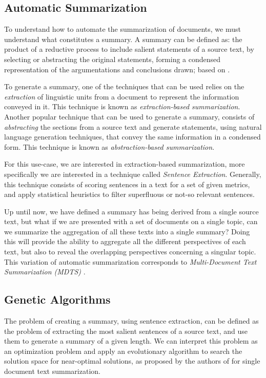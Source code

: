 \documentclass[12pt, titlepage]{uo_temp}
\begin{document}
     \subsection{Automatic Summarization}
     To understand how to automate the summarization of documents, we must understand
     what constitutes a summary. A summary can be defined as: the product of a reductive process
     to include salient statements of a source text, by selecting or abstracting the
     original statements, forming a condensed representation of the argumentations and
     conclusions drawn; based on \cite{jones1999automatic}.  
     
     To generate a summary, one of the techniques that can be used relies on the
     \emph{extraction} of linguistic units from a document to represent the information
     conveyed in it. This technique is known as \emph{extraction-based
       summarization}. Another popular technique that can be used to generate a summary,
     consists of \emph{abstracting} the sections from a source text and generate
     statements, using natural language generation techniques, that convey the same
     information in a condensed form. This technique is known as \emph{abstraction-based
       summarization}.

     For this use-case, we are interested in extraction-based summarization, more
     specifically we are interested in a technique called \emph{Sentence
       Extraction}. Generally, this technique consists of scoring sentences in a text for
     a set of given metrics, and apply statistical heuristics to filter superfluous or
     not-so relevant sentences.

     Up until now, we have defined a summary has being derived from a single source text,
     but what if we are presented with a set of documents on a single topic, can we
     summarize the aggregation of all these texts into a single summary? Doing this will
     provide the ability to aggregate all the different perspectives of each text, but
     also to reveal the overlapping perspectives concerning a singular topic. This
     variation of automatic summarization corresponds to \emph{Multi-Document Text
       Summarization (MDTS)} \cite{goldstein2000multi}.

     
     \subsection{Genetic Algorithms}
     The problem of creating a summary, using sentence extraction, can be defined as the
     problem of extracting the most salient sentences of a source text, and use them to
     generate a summary of a given length. We can interpret this problem as an
     optimization problem and apply an evolutionary algorithm to search the solution space
     for near-optimal solutions, as proposed by the authors of
     \cite{qazvinian2008summarising} for single document text summarization.
     
\end{document}

